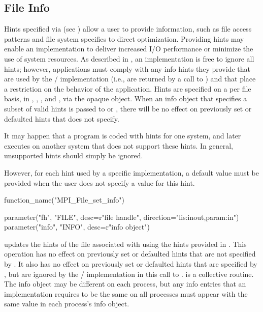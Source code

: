 \subsection{File Info}
\label{sec:io-info}

Hints specified via 
(see )
allow a user to provide information,
such as
file access patterns and file system specifics
to direct optimization.
Providing hints may enable an implementation to deliver
increased I/O performance or minimize the use of system resources.
As described in ,
an implementation is free to ignore all hints; however, applications
must comply with any info hints they provide that are used by the \MPI/
implementation (i.e., are returned by a call to
) and that place a restriction on the
behavior of the application.
Hints are specified on a per file basis,
in , ,
, and ,
via the opaque  object.
When an info object that specifies a subset of valid hints is passed to
 or , 
there will be no effect on
previously set or defaulted hints that  does not specify. 

\begin{implementors}
It may happen that a program is coded with hints for one system, and
later executes on another system that does not support these hints.
In general, unsupported hints should simply be ignored.

However, for each hint used by a specific implementation,
a default value must be provided
when the user does not specify a value for this hint.
\end{implementors}

%
%
\begin{mpi-binding}
    function_name("MPI_File_set_info")
    
    parameter("fh", "FILE", desc=r"file handle", direction="lis:inout,param:in")
    parameter("info", "INFO", desc=r"info object")
\end{mpi-binding}

 updates the hints of the file
associated with  using the hints provided in .
This operation has no effect on previously set or defaulted hints that
are not specified by .  It also has no effect on previously
set or defaulted hints that are specified by , but are
ignored by the \MPI/ implementation in this call to
.
 is a collective routine.
The info object
may be different on each process, but any info entries that an
implementation requires to be the same on all processes must
appear
with the same value
in each process's info object.

